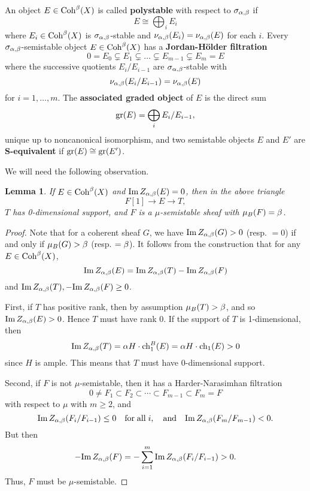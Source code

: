 \documentclass[letterpaper,12pt]{amsart}
\newtheorem{lem}[thm]{Lemma}
\theoremstyle{remark}
\begin{document}
An object $E \in \mathrm{Coh}^\beta(X)$ is called \textbf{polystable} with respect to $\sigma_{\alpha,\beta}$ if 
\[ E \cong \bigoplus_i E_i \] 
where $E_i \in \mathrm{Coh}^\beta(X)$ is $\sigma_{\alpha,\beta}$-stable and $\nu_{\alpha,\beta}(E_i) = \nu_{\alpha,\beta}(E)$ for each $i$. Every $\sigma_{\alpha,\beta}$-semistable object $E \in \mathrm{Coh}^\beta(X)$ has a \textbf{Jordan-H\"older filtration}
\[ 0 = E_0 \subsetneq E_1 \subsetneq \ldots \subsetneq E_{m-1} \subsetneq E_m = E \]
where the successive quotients $E_i/E_{i-1}$ are $\sigma_{\alpha,\beta}$-stable with 
\[ \nu_{\alpha,\beta}(E_i/E_{i-1}) = \nu_{\alpha,\beta}(E) \] 
for $i = 1,\ldots,m$. The \textbf{associated graded object} of $E$ is the direct sum 
\[ \operatorname{\mathrm{gr}}(E) = \bigoplus_i E_i/E_{i-1}, \] 
unique up to noncanonical isomorphism, and two semistable objects $E$ and $E'$ are \textbf{S-equivalent} if $\operatorname{\mathrm{gr}}(E) \cong \operatorname{\mathrm{gr}}(E')$.

We will need the following observation. 
\begin{lem}\label{ss-ses}
    If $E \in \mathrm{Coh}^\beta(X)$ and $\mathrm{Im}\, Z_{\alpha,\beta}(E) = 0$, then in the above triangle 
    \[ F[1] \to E \to T, \]
    $T$ has 0-dimensional support, and $F$ is a $\mu$-semistable sheaf with $\mu_B(F) \\ = \beta$.
\end{lem}
\begin{proof}
    Note that for a coherent sheaf $G$, we have $\mathrm{Im}\, Z_{\alpha,\beta}(G) > 0$ (resp. $= 0$) if and only if $\mu_B(G) > \beta$ (resp. $= \beta$). It follows from the construction that for any $E \in \mathrm{Coh}^\beta(X)$,
    \[ \mathrm{Im}\, Z_{\alpha,\beta}(E) = \mathrm{Im}\, Z_{\alpha,\beta}(T) - \mathrm{Im}\, Z_{\alpha,\beta}(F) \]
    and $\mathrm{Im}\, Z_{\alpha,\beta}(T), -\mathrm{Im}\, Z_{\alpha,\beta}(F) \ge 0$. 
    
    First, if $T$ has positive rank, then by assumption $\mu_B(T) > \beta$, and so $\mathrm{Im}\, Z_{\alpha,\beta}(E) > 0$. Hence $T$ must have rank 0. If the support of $T$ is 1-dimensional, then \[ \mathrm{Im}\, Z_{\alpha,\beta}(T) = \alpha H \cdot \operatorname{\mathrm{ch}}^B_1(E) = \alpha H \cdot \operatorname{\mathrm{ch}}_1(E) > 0 \]
    since $H$ is ample. This means that $T$ must have 0-dimensional support.
    
    Second, if $F$ is not $\mu$-semistable, then it has a Harder-Narasimhan filtration
    \[ 0 \neq F_1 \subset F_2 \subset \cdots \subset F_{m-1} \subset F_m = F \]
    with respect to $\mu$ with $m \ge 2$, and 
    \[ \mathrm{Im}\, Z_{\alpha,\beta}(F_i/F_{i-1}) \le 0 \quad \mathrm{for\;all}\; i, \quad \mathrm{and} \quad \mathrm{Im}\, Z_{\alpha,\beta}(F_m/F_{m-1}) < 0. \] 
    But then
    \[ - \mathrm{Im}\, Z_{\alpha,\beta}(F) = - \sum_{i=1}^m \mathrm{Im}\, Z_{\alpha,\beta}(F_i/F_{i-1}) > 0. \]
    Thus, $F$ must be $\mu$-semistable.
\end{proof}
\end{document}
